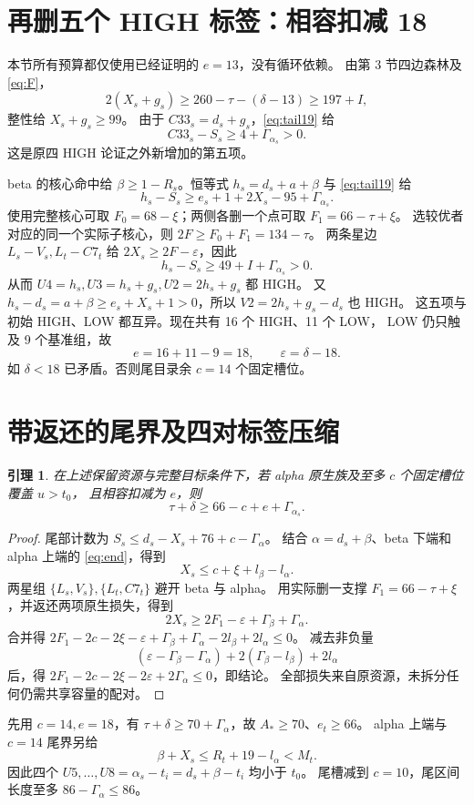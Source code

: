 \documentclass[11pt,a4paper]{article}
\newcommand{\A}{A_*}
\newcommand{\eps}{\varepsilon}
\newtheorem{lemma}[theorem]{引理}
\begin{document}
\section{再删五个 HIGH 标签：相容扣减 18}
本节所有预算都仅使用已经证明的 $e=13$，没有循环依赖。
由第 3 节四边森林及 \eqref{eq:F}，
\[2(X_s+g_s)\ge260-\tau-(\delta-13)\ge197+I,\]
整性给 $X_s+g_s\ge99$。
由于 $C33_s=d_s+g_s$，\eqref{eq:tail19} 给
\[C33_s-S_s\ge4+\Gamma_{\alpha_s}>0.\]
这是原四 HIGH 论证之外新增加的第五项。

beta 的核心命中给 $\beta\ge1-R_s$。恒等式
$h_s=d_s+a+\beta$ 与 \eqref{eq:tail19} 给
\[h_s-S_s\ge e_s+1+2X_s-95+\Gamma_{\alpha_s}.\]
使用完整核心可取 $F_0=68-\xi$；两侧各删一个点可取 $F_1=66-\tau+\xi$。
选较优者对应的同一个实际子核心，则 $2F\ge F_0+F_1=134-\tau$。
两条星边 $L_s-V_s,L_t-C7_t$ 给 $2X_s\ge2F-\eps$，因此
\[h_s-S_s\ge49+I+\Gamma_{\alpha_s}>0.\]
从而 $U4=h_s,U3=h_s+g_s,U2=2h_s+g_s$ 都 HIGH。
又 $h_s-d_s=a+\beta\ge e_s+X_s+1>0$，所以 $V2=2h_s+g_s-d_s$ 也 HIGH。
这五项与初始 HIGH、LOW 都互异。现在共有 16 个 HIGH、11 个 LOW，
LOW 仍只触及 9 个基准组，故
\begin{equation}\label{eq:e18}
e=16+11-9=18,\qquad\eps=\delta-18.
\end{equation}
如 $\delta<18$ 已矛盾。否则尾目录余 $c=14$ 个固定槽位。

\section{带返还的尾界及四对标签压缩}
\begin{lemma}\label{lem:tail}
在上述保留资源与完整目标条件下，若 alpha 原生族及至多 $c$ 个固定槽位覆盖 $u>t_0$，
且相容扣减为 $e$，则
\[\boxed{\tau+\delta\ge66-c+e+\Gamma_{\alpha_s}.}\]
\end{lemma}
\begin{proof}
尾部计数为 $S_s\le d_s-X_s+76+c-\Gamma_\alpha$。
结合 $\alpha=d_s+\beta$、beta 下端和 alpha 上端的 \eqref{eq:end}，得到
\[X_s\le c+\xi+l_\beta-l_\alpha.\]
两星组 $\{L_s,V_s\},\{L_t,C7_t\}$ 避开 beta 与 alpha。
用实际删一支撑 $F_1=66-\tau+\xi$，并返还两项原生损失，得到
\[2X_s\ge2F_1-\eps+\Gamma_\beta+\Gamma_\alpha.\]
合并得
$2F_1-2c-2\xi-\eps+\Gamma_\beta+\Gamma_\alpha-2l_\beta+2l_\alpha\le0$。
减去非负量
\[(\eps-\Gamma_\beta-\Gamma_\alpha)+2(\Gamma_\beta-l_\beta)+2l_\alpha\]
后，得 $2F_1-2c-2\xi-2\eps+2\Gamma_\alpha\le0$，即结论。
全部损失来自原资源，未拆分任何仍需共享容量的配对。
\end{proof}

先用 $c=14,e=18$，有 $\tau+\delta\ge70+\Gamma_\alpha$，故 $\A\ge70$、$e_t\ge66$。
alpha 上端与 $c=14$ 尾界另给
\[\beta+X_s\le R_t+19-l_\alpha<M_t.\]
因此四个 $U5,\ldots,U8=\alpha_s-t_i=d_s+\beta-t_i$ 均小于 $t_0$。
尾槽减到 $c=10$，尾区间长度至多 $86-\Gamma_\alpha\le86$。
\end{document}
